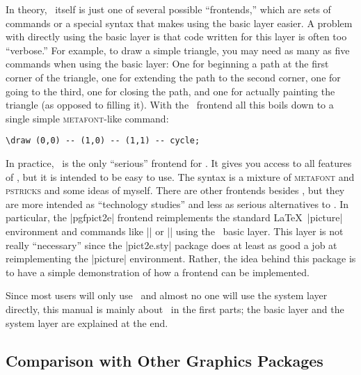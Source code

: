 In theory, \tikzname\ itself is just one of several possible
``frontends,'' which are sets of commands or a special syntax that
makes using the basic layer easier. A problem with directly using the
basic layer is that code written for this layer is often too
``verbose.'' For example, to draw a simple 
triangle, you may need as many as five commands when using the basic
layer: One for beginning a path at the first corner of the triangle,
one for extending the path to the second corner, one for going to
the third, one for closing the path, and one for actually painting
the triangle (as opposed to filling it). With the \tikzname\ frontend
all this boils down to a single simple \textsc{metafont}-like
command:
\begin{verbatim}
\draw (0,0) -- (1,0) -- (1,1) -- cycle;
\end{verbatim}

In practice, \tikzname\ is the only ``serious'' frontend for \pgfname. It
gives you access to all features of \pgfname, but it is intended to be
easy to use. The syntax is a mixture of \textsc{metafont} and
\textsc{pstricks} and some ideas of myself. There are other frontends
besides \tikzname, but they are more intended as ``technology
studies'' and less as serious alternatives to \tikzname. In
particular, the |pgfpict2e| frontend   reimplements the standard
\LaTeX\ |{picture}|  environment and 
commands like |\line| or |\vector| 
using the \pgfname\ basic layer. This layer is not really ``necessary''
since the |pict2e.sty| package does at least as good a job at
reimplementing the |{picture}| environment. Rather, the idea
behind this package is to have a simple demonstration of how a
frontend can be implemented. 

Since most users will only use \tikzname\ and almost no one will use
the system layer directly, this manual is mainly about \tikzname\ in
the first parts; the basic layer and the system layer are explained at
the end.


\subsection{Comparison with Other Graphics Packages}

